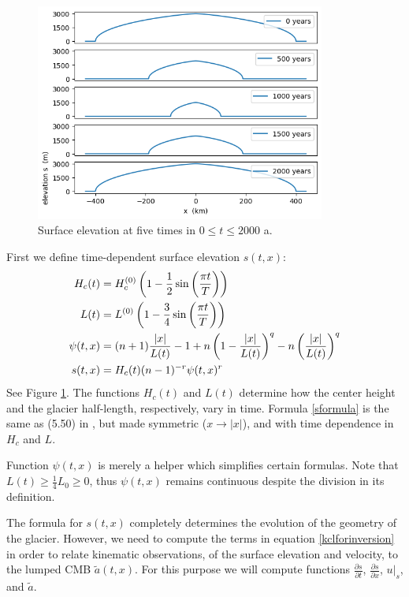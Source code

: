 \documentclass[letterpaper,final,12pt,reqno]{amsart}
\begin{document}
\begin{figure}[t]
\includegraphics[width=0.85\textwidth]{surfacesnaps}
\caption{Surface elevation at five times in $0\le t \le 2000$ a.}
\label{surfacesnaps}
\end{figure}

First we define time-dependent surface elevation $s(t,x)$:
\begin{align}
H_c(t) &= H_c^{(0)} \left(1 - \frac{1}{2} \sin\left(\frac{\pi t}{T}\right)\right) \notag \\
L(t) &= L^{(0)} \left(1 - \frac{3}{4} \sin\left(\frac{\pi t}{T}\right)\right) \notag\\
\psi(t,x) &= (n+1) \frac{|x|}{L(t)} - 1 + n \left(1 - \frac{|x|}{L(t)}\right)^q - n \left(\frac{|x|}{L(t)}\right)^q \notag \\
s(t,x) &= H_c(t) (n-1)^{-r} \psi(t,x)^r \label{sformula}
\end{align}
See Figure \ref{surfacesnaps}.  The functions $H_c(t)$ and $L(t)$ determine how the center height and the glacier half-length, respectively, vary in time.  Formula \eqref{sformula} is the same as (5.50) in \cite{vanderVeen2013}, but made symmetric ($x \to |x|$), and with time dependence in $H_c$ and $L$.

Function $\psi(t,x)$ is merely a helper which simplifies certain formulas.  Note that $L(t)\ge \frac{1}{4} L_0 \ge 0$, thus $\psi(t,x)$ remains continuous despite the division in its definition.

The formula for $s(t,x)$ completely determines the evolution of the geometry of the glacier.  However, we need to compute the terms in equation \eqref{kclforinversion} in order to relate kinematic observations, of the surface elevation and velocity, to the lumped CMB $\tilde a(t,x)$.  For this purpose we will compute functions $\frac{\partial s}{\partial t}$, $\frac{\partial s}{\partial x}$, $u|_s$, and $\tilde a$.
\end{document}
